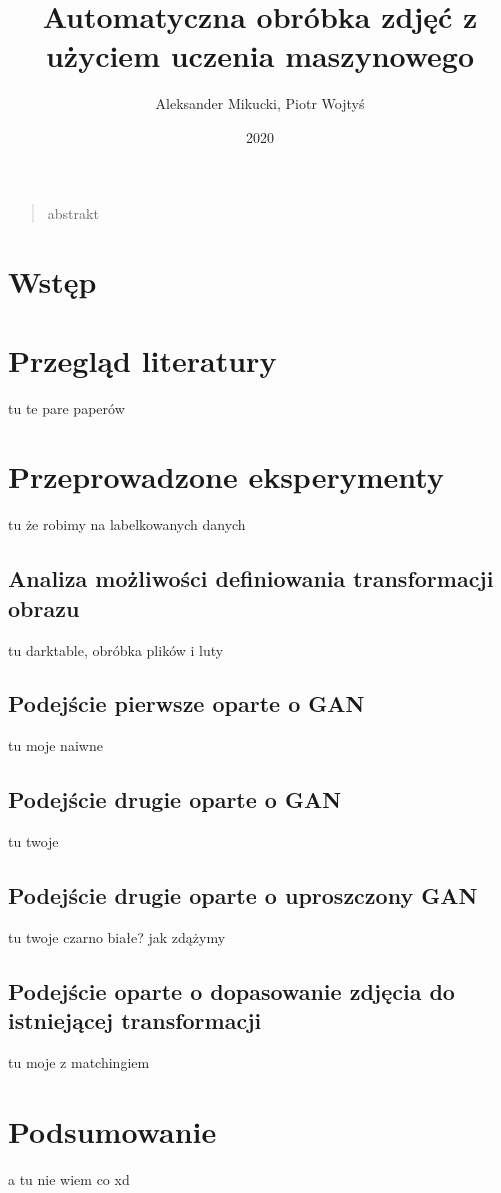 \documentclass[12pt]{article}
\title{Automatyczna obróbka zdjęć z użyciem uczenia maszynowego}
\author
{Aleksander Mikucki, Piotr Wojtyś}
\date{2020}
\newenvironment{sciabstract}{%
\begin{quote} \bf}
{\end{quote}}
\begin{document}
 


\baselineskip24pt


\maketitle 




\begin{sciabstract}

abstrakt

\end{sciabstract}


\section*{Wstęp}
\section*{Przegląd literatury}
tu te pare paperów
\section*{Przeprowadzone eksperymenty}
tu że robimy na labelkowanych danych
\subsection*{Analiza możliwości definiowania transformacji obrazu}
tu darktable, obróbka plików i luty
\subsection*{Podejście pierwsze oparte o GAN}
tu moje naiwne
\subsection*{Podejście drugie oparte o GAN}
tu twoje
\subsection*{Podejście drugie oparte o uproszczony GAN}
tu twoje czarno białe? jak zdążymy
\subsection*{Podejście oparte o dopasowanie zdjęcia do istniejącej transformacji}
tu moje z matchingiem
\section*{Podsumowanie}
a tu nie wiem co xd




\end{document}

